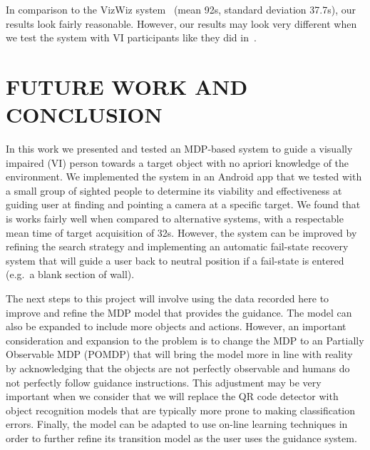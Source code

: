 \documentclass[a4paper, twoside]{article}
\begin{document}
In comparison to the VizWiz system~\cite{bigham2010vizwiz} (mean 92s, standard deviation 37.7s), our results look fairly reasonable. However, our results may look very different when we test the system with VI participants like they did in~\cite{bigham2010vizwiz}.

\section{\uppercase{Future Work and Conclusion}}

\noindent In this work we presented and tested an MDP-based system to guide a visually impaired (VI) person towards a target object with no apriori knowledge of the environment. We implemented the system in an Android app that we tested with a small group of sighted people to determine its viability and effectiveness at guiding user at finding and pointing a camera at a specific target. We found that is works fairly well when compared to alternative systems, with a respectable mean time of target acquisition of 32s. However, the system can be improved by refining the search strategy and implementing an automatic fail-state recovery system that will guide a user back to neutral position if a fail-state is entered (e.g.\ a blank section of wall). 

The next steps to this project will involve using the data recorded here to improve and refine the MDP model that provides the guidance. The model can also be expanded to include more objects and actions. However, an important consideration and expansion to the problem is to change the MDP to an Partially Observable MDP (POMDP) that will bring the model more in line with reality by acknowledging that the objects are not perfectly observable and humans do not perfectly follow guidance instructions. This adjustment may be very important when we consider that we will replace the QR code detector with object recognition models that are typically more prone to making classification errors. Finally, the model can be adapted to use on-line learning techniques in order to further refine its transition model as the user uses the guidance system. 

\clearpage


\end{document}
